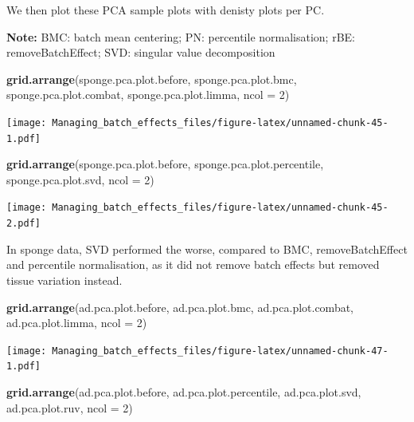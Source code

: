 \documentclass[]{book}
\newenvironment{Shaded}{\begin{snugshade}}{\end{snugshade}}
\newcommand{\KeywordTok}[1]{\textcolor[rgb]{0.13,0.29,0.53}{\textbf{#1}}}
\newcommand{\DataTypeTok}[1]{\textcolor[rgb]{0.13,0.29,0.53}{#1}}
\newcommand{\DecValTok}[1]{\textcolor[rgb]{0.00,0.00,0.81}{#1}}
\newcommand{\NormalTok}[1]{#1}
\begin{document}
We then plot these PCA sample plots with denisty plots per PC.

\textbf{Note:} BMC: batch mean centering; PN: percentile normalisation;
rBE: removeBatchEffect; SVD: singular value decomposition

\begin{Shaded}
\begin{Highlighting}[]
\KeywordTok{grid.arrange}\NormalTok{(sponge.pca.plot.before, sponge.pca.plot.bmc, }
\NormalTok{             sponge.pca.plot.combat, sponge.pca.plot.limma, }\DataTypeTok{ncol =} \DecValTok{2}\NormalTok{)}
\end{Highlighting}
\end{Shaded}

\texttt{[image: Managing\_batch\_effects\_files/figure-latex/unnamed-chunk-45-1.pdf]}

\begin{Shaded}
\begin{Highlighting}[]
\KeywordTok{grid.arrange}\NormalTok{(sponge.pca.plot.before, sponge.pca.plot.percentile, }
\NormalTok{             sponge.pca.plot.svd, }\DataTypeTok{ncol =} \DecValTok{2}\NormalTok{)}
\end{Highlighting}
\end{Shaded}

\texttt{[image: Managing\_batch\_effects\_files/figure-latex/unnamed-chunk-45-2.pdf]}

In sponge data, SVD performed the worse, compared to BMC,
removeBatchEffect and percentile normalisation, as it did not remove
batch effects but removed tissue variation instead.

\begin{Shaded}
\begin{Highlighting}[]
\KeywordTok{grid.arrange}\NormalTok{(ad.pca.plot.before, ad.pca.plot.bmc, }
\NormalTok{             ad.pca.plot.combat, ad.pca.plot.limma, }\DataTypeTok{ncol =} \DecValTok{2}\NormalTok{)}
\end{Highlighting}
\end{Shaded}

\texttt{[image: Managing\_batch\_effects\_files/figure-latex/unnamed-chunk-47-1.pdf]}

\begin{Shaded}
\begin{Highlighting}[]
\KeywordTok{grid.arrange}\NormalTok{(ad.pca.plot.before, ad.pca.plot.percentile, }
\NormalTok{             ad.pca.plot.svd, ad.pca.plot.ruv, }\DataTypeTok{ncol =} \DecValTok{2}\NormalTok{)}
\end{Highlighting}
\end{Shaded}
\end{document}
